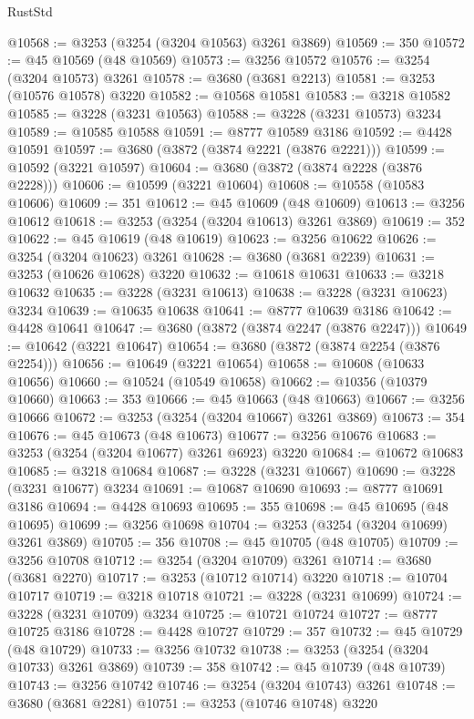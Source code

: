 \begin{lexlean}{RustStd}
\begin{coremodule}
{\begin{coremodule}
{{{{{{{{{{{{{{{{{{{{{{{{{{{{{{{{{{{{{@10568 := @3253 (@3254 (@3204 @10563) @3261 @3869)
@10569 := 350
@10572 := @45 @10569 (@48 @10569)
@10573 := @3256 @10572
@10576 := @3254 (@3204 @10573) @3261
@10578 := @3680 (@3681 @2213)
@10581 := @3253 (@10576 @10578) @3220
@10582 := @10568 @10581
@10583 := @3218 @10582
@10585 := @3228 (@3231 @10563)
@10588 := @3228 (@3231 @10573) @3234
@10589 := @10585 @10588
@10591 := @8777 @10589 @3186
@10592 := @4428 @10591
@10597 := @3680 (@3872 (@3874 @2221 (@3876 @2221)))
@10599 := @10592 (@3221 @10597)
@10604 := @3680 (@3872 (@3874 @2228 (@3876 @2228)))
@10606 := @10599 (@3221 @10604)
@10608 := @10558 (@10583 @10606)
@10609 := 351
@10612 := @45 @10609 (@48 @10609)
@10613 := @3256 @10612
@10618 := @3253 (@3254 (@3204 @10613) @3261 @3869)
@10619 := 352
@10622 := @45 @10619 (@48 @10619)
@10623 := @3256 @10622
@10626 := @3254 (@3204 @10623) @3261
@10628 := @3680 (@3681 @2239)
@10631 := @3253 (@10626 @10628) @3220
@10632 := @10618 @10631
@10633 := @3218 @10632
@10635 := @3228 (@3231 @10613)
@10638 := @3228 (@3231 @10623) @3234
@10639 := @10635 @10638
@10641 := @8777 @10639 @3186
@10642 := @4428 @10641
@10647 := @3680 (@3872 (@3874 @2247 (@3876 @2247)))
@10649 := @10642 (@3221 @10647)
@10654 := @3680 (@3872 (@3874 @2254 (@3876 @2254)))
@10656 := @10649 (@3221 @10654)
@10658 := @10608 (@10633 @10656)
@10660 := @10524 (@10549 @10658)
@10662 := @10356 (@10379 @10660)
@10663 := 353
@10666 := @45 @10663 (@48 @10663)
@10667 := @3256 @10666
@10672 := @3253 (@3254 (@3204 @10667) @3261 @3869)
@10673 := 354
@10676 := @45 @10673 (@48 @10673)
@10677 := @3256 @10676
@10683 := @3253 (@3254 (@3204 @10677) @3261 @6923) @3220
@10684 := @10672 @10683
@10685 := @3218 @10684
@10687 := @3228 (@3231 @10667)
@10690 := @3228 (@3231 @10677) @3234
@10691 := @10687 @10690
@10693 := @8777 @10691 @3186
@10694 := @4428 @10693
@10695 := 355
@10698 := @45 @10695 (@48 @10695)
@10699 := @3256 @10698
@10704 := @3253 (@3254 (@3204 @10699) @3261 @3869)
@10705 := 356
@10708 := @45 @10705 (@48 @10705)
@10709 := @3256 @10708
@10712 := @3254 (@3204 @10709) @3261
@10714 := @3680 (@3681 @2270)
@10717 := @3253 (@10712 @10714) @3220
@10718 := @10704 @10717
@10719 := @3218 @10718
@10721 := @3228 (@3231 @10699)
@10724 := @3228 (@3231 @10709) @3234
@10725 := @10721 @10724
@10727 := @8777 @10725 @3186
@10728 := @4428 @10727
@10729 := 357
@10732 := @45 @10729 (@48 @10729)
@10733 := @3256 @10732
@10738 := @3253 (@3254 (@3204 @10733) @3261 @3869)
@10739 := 358
@10742 := @45 @10739 (@48 @10739)
@10743 := @3256 @10742
@10746 := @3254 (@3204 @10743) @3261
@10748 := @3680 (@3681 @2281)
@10751 := @3253 (@10746 @10748) @3220
}}}}}}}}}}}}}}}}}}}}}}}}}}}}}}}}}}}}}
\end{coremodule}}
\end{coremodule}
\end{lexlean}

